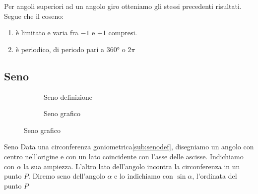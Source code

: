 Per angoli superiori ad un angolo giro otteniamo gli stessi precedenti risultati. 
Segue che il coseno:
\begin{enumerate}
	\item è limitato e varia fra $-1$ e $+1$ compresi.
	\item è periodico, di periodo pari a \ang{360} o $2\pi$
	\end{enumerate} 
\begin{figure}
		\centering

		\label{fig:AndamentoCoseno1}
	\end{figure}%
	\begin{figure}
		\centering

		\label{fig:AndamentoCoseno2}
\end{figure}
\subsection{Seno}
\label{sec:senogonio}
\begin{figure}
	\begin{subfigure}[b]{.5\linewidth}
		\centering
			
		\caption{Seno definizione}\label{sub:senodef}
	\end{subfigure}%
	\begin{subfigure}[b]{.5\linewidth}
		\centering
		
		\caption{Seno grafico}\label{sub:senograf}
	\end{subfigure}
	\label{tab:funseno}
\end{figure}
\begin{definizionet}{Seno}{}
	Data una circonferenza goniometrica\nobs\vref{sub:senodef}, disegniamo un angolo con centro nell'origine e con un lato coincidente con l'asse delle ascisse. Indichiamo con  $\alpha$ la sua ampiezza. L'altro lato dell'angolo incontra la circonferenza in un punto $P$. Diremo seno dell'angolo $\alpha$ e lo indichiamo con $\sin\alpha$, l'ordinata del punto $P$
\end{definizionet}
\begin{figure}
	\centering
	
	\label{fig:AndamentoSeno1}
\end{figure}%

